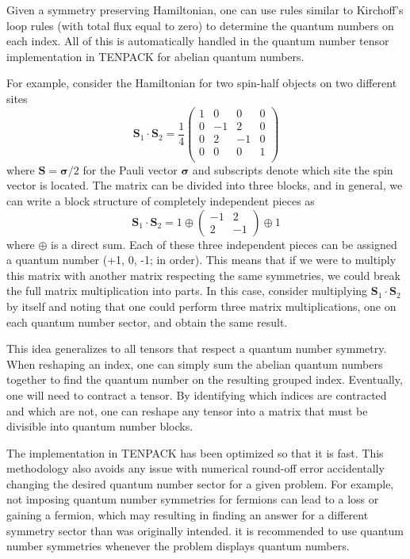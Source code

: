 \documentclass{juliacon}
\begin{document}
\begin{appendix}
Given a symmetry preserving Hamiltonian, one can use rules similar to Kirchoff's loop rules (with total flux equal to zero) to determine the quantum numbers on each index. All of this is automatically handled in the quantum number tensor implementation in TENPACK for abelian quantum numbers. 

For example, consider the Hamiltonian for two spin-half objects on two different sites
\begin{equation}
\mathbf{S}_1\cdot\mathbf{S}_2=\frac14\left(\begin{array}{cccc}
1 & 0 & 0 & 0\\
0 & -1 & 2 & 0\\
0 & 2 & -1 & 0\\
0 & 0 & 0 & 1\\
\end{array}\right)
\end{equation}
where $\mathbf{S}=\boldsymbol{\sigma}/2$ for the Pauli vector $\boldsymbol{\sigma}$ \cite{townsend2000modern} and subscripts denote which site the spin vector is located. The matrix can be divided into three blocks, and in general, we can write a block structure of completely independent pieces as
\begin{equation}
\mathbf{S}_1\cdot\mathbf{S}_2=1\oplus\left(\begin{array}{cc}
-1 & 2 \\
2 & -1
\end{array}\right)\oplus1
\end{equation}
where $\oplus$ is a direct sum. Each of these three independent pieces can be assigned a quantum number (+1, 0, -1; in order). This means that if we were to multiply this matrix with another matrix respecting the same symmetries, we could break the full matrix multiplication into parts. In this case, consider multiplying $\mathbf{S}_1\cdot\mathbf{S}_2$ by itself and noting that one could perform three matrix multiplications, one on each quantum number sector, and obtain the same result.

This idea generalizes to all tensors that respect a quantum number symmetry. When reshaping an index, one can simply sum the abelian quantum numbers together to find the quantum number on the resulting grouped index. Eventually, one will need to contract a tensor. By identifying which indices are contracted and which are not, one can reshape any tensor into a matrix that must be divisible into quantum number blocks.

The implementation in TENPACK has been optimized so that it is fast. This methodology also avoids any issue with numerical round-off error accidentally changing the desired quantum number sector for a given problem. For example, not imposing quantum number symmetries for fermions can lead to a loss or gaining a fermion, which may resulting in finding an answer for a different symmetry sector than was originally intended. it is recommended to use quantum number symmetries whenever the problem displays quantum numbers.



\end{appendix}
\end{document}
